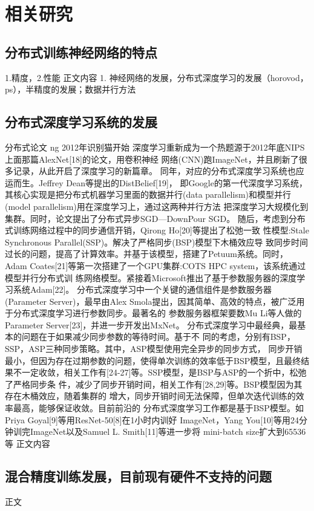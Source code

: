 \chapter{相关研究}
\section{分布式训练神经网络的特点}
1.精度，2.性能
正文内容
1. 神经网络的发展，分布式深度学习的发展（horovod，ps），半精度的发展；数据并行方法
\section{分布式深度学习系统的发展}
分布式论文 ng 2012年识别猫开始
深度学习重新成为一个热题源于2012年底NIPS上面那篇AlexNet[18]的论文，用卷积神经 网络(CNN)跑ImageNet，并且刷新了很多记录，从此开启了深度学习的新篇章。
同年，对应的分布式深度学习系统也应运而生。Jeffrey Dean等提出的DistBelief[19]， 即Google的第一代深度学习系统，其核心实现是把分布式机器学习里面的数据并行(data parallelism)和模型并行(model parallelism)用在深度学习上，通过这两种并行方法 把深度学习大规模化到集群。同时，论文提出了分布式异步SGD—DownPour SGD。
随后，考虑到分布式训练网络过程中的同步通信开销，Qirong Ho[20]等提出了松弛一致 性模型:Stale Synchronous Parallel(SSP)。解决了严格同步(BSP)模型下木桶效应导 致同步时间过长的问题，提高了计算效率。并基于该模型，搭建了Petuum系统。同时，Adam Coates[21]等第一次搭建了一个GPU集群:COTS HPC system，该系统通过模型并行分布式训 练网络模型。紧接着Microsoft推出了基于参数服务器的深度学习系统Adam[22]。
分布式深度学习中一个关键的通信组件是参数服务器(Parameter Server)，最早由Alex Smola提出，因其简单、高效的特点，被广泛用于分布式深度学习进行参数同步。最著名的 参数服务器框架要数Mu Li等人做的Parameter Server[23]，并进一步开发出MxNet。
分布式深度学习中最经典，最基本的问题在于如果减少同步参数的等待时间。基于不 同的考虑，分别有BSP，SSP，ASP三种同步策略。其中，ASP模型使用完全异步的同步方式， 同步开销最小，但因为存在过期参数的问题，使得单次训练的效率低于BSP模型，且最终结 果不一定收敛，相关工作有[24-27]等。SSP模型，是BSP与ASP的一个折中，松弛了严格同步条 件，减少了同步开销时间，相关工作有[28,29]等。BSP模型因为其存在木桶效应，随着集群的 增大，同步开销时间无法保障，但单次迭代训练的效率最高，能够保证收敛。目前前沿的 分布式深度学习工作都是基于BSP模型。如Priya Goyal[9]等用ResNet-50[8]在1小时内训好 ImageNet，Yang You[10]等用24分钟训完ImageNet以及Samuel L. Smith[11]等进一步将 mini-batch size扩大到65536等
正文内容
\section{混合精度训练发展，目前现有硬件不支持的问题}
正文